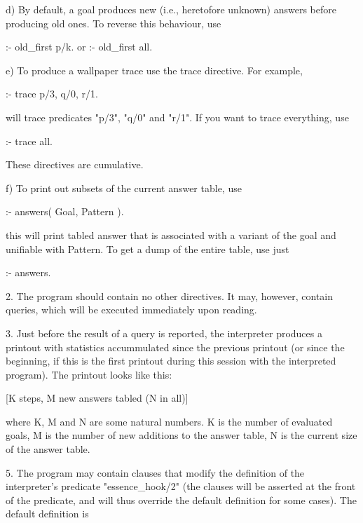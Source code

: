        d) By default, a goal produces new (i.e., heretofore unknown) answers
          before producing old ones.  To reverse this behaviour, use

              :- old\_first p/k.
          or
              :- old\_first all.

       e) To produce a wallpaper trace use the trace directive. For example,

              :- trace p/3, q/0, r/1.

          will trace predicates "p/3", "q/0" and "r/1".  If you want to trace
          everything, use

              :- trace all.

          These directives are cumulative.

       f) To print out subsets of the current answer table, use

              :- answers( Goal, Pattern ).

          this will print tabled answer that is associated with a variant
          of the goal and unifiable with Pattern.
          To get a dump of the entire table, use just

              :- answers.

    2. The program should contain no other directives. It may, however,
       contain queries, which will be executed immediately upon reading.

    3. Just before the result of a query is reported, the interpreter
       produces a printout with statistics accummulated since the previous
       printout (or since the beginning, if this is the first printout during
       this session with the interpreted program). The printout looks like
       this:

           [K steps, M new answers tabled (N in all)]

       where K, M and N are some natural numbers. K is the number of
       evaluated goals, M is the number of new additions to the answer table,
       N is the current size of the answer table.



    5. The program may contain clauses that modify the definition of the
       interpreter's predicate "essence\_hook/2" (the clauses will be asserted
       at the front of the predicate, and will thus override the default
       definition for some cases).  The default definition is

